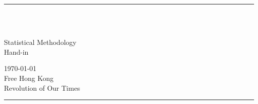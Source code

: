 \fancyhead[C]{}
\hrule \medskip
\begin{minipage}{0.295\textwidth} 
\raggedright
\footnotesize
\yourname \hfill\\
\yournetid \hfill\\
\yourgp
\end{minipage}
\begin{minipage}{0.4\textwidth} 
\centering 
\large
Statistical Methodology\\ 
\large 
Hand-in  \assignmentnumber\\ 
\end{minipage}
\begin{minipage}{0.295\textwidth} 
\raggedleft
\today\hfill\\
Free Hong Kong
\\Revolution of Our Times 
\end{minipage}
\medskip\hrule 
\bigskip
